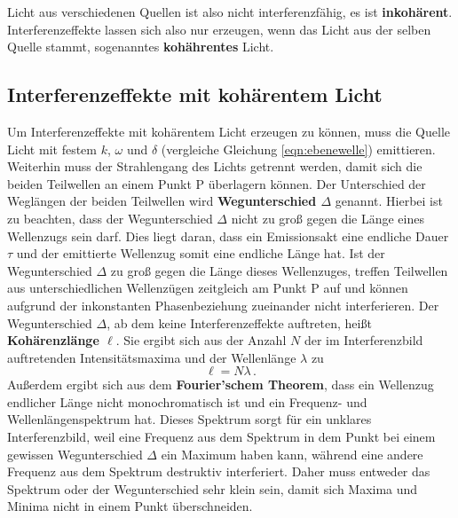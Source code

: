 Licht aus verschiedenen Quellen ist also nicht interferenzfähig, es ist \textbf{inkohärent}.
Interferenzeffekte lassen sich also nur erzeugen, wenn das Licht aus der selben Quelle stammt,
sogenanntes \textbf{kohährentes} Licht.


\subsection{Interferenzeffekte mit kohärentem Licht}
\label{sec:kohärenz}

Um Interferenzeffekte mit kohärentem Licht erzeugen zu können, muss die Quelle Licht mit
festem $k$, $\omega$ und $\delta$ (vergleiche Gleichung \eqref{eqn:ebenewelle}) emittieren.
Weiterhin muss der Strahlengang des Lichts getrennt werden, damit sich die beiden Teilwellen
an einem Punkt P überlagern können.
Der Unterschied der Weglängen der beiden Teilwellen wird \textbf{Wegunterschied $\Delta$}
genannt.
Hierbei ist zu beachten, dass der Wegunterschied $\Delta$ nicht zu groß gegen die Länge eines
Wellenzugs sein darf. Dies liegt daran, dass ein Emissionsakt eine endliche Dauer $\tau$ und der
emittierte Wellenzug somit eine endliche Länge hat. Ist der Wegunterschied $\Delta$ zu groß
gegen die Länge dieses Wellenzuges, treffen Teilwellen aus unterschiedlichen Wellenzügen
zeitgleich am Punkt P auf und können aufgrund der inkonstanten Phasenbeziehung zueinander nicht
interferieren.
Der Wegunterschied $\Delta$, ab dem keine Interferenzeffekte auftreten, heißt \textbf{
	Kohärenzlänge $\ell$}. Sie ergibt sich aus der Anzahl $N$ der im Interferenzbild
auftretenden Intensitätsmaxima und der Wellenlänge $\lambda$ zu
\begin{equation}
	\ell = N \lambda \, \mathrm{.}
\end{equation}
Außerdem ergibt sich aus dem \textbf{Fourier'schem Theorem}, dass ein Wellenzug endlicher
Länge nicht monochromatisch ist und ein Frequenz- und Wellenlängenspektrum hat. Dieses
Spektrum sorgt für ein unklares Interferenzbild, weil eine Frequenz aus dem Spektrum in dem
Punkt bei einem gewissen Wegunterschied $\Delta$ ein Maximum haben kann, während eine andere
Frequenz aus dem Spektrum destruktiv interferiert. Daher muss entweder das Spektrum oder der
Wegunterschied sehr klein sein, damit sich Maxima und Minima nicht in einem Punkt überschneiden.

